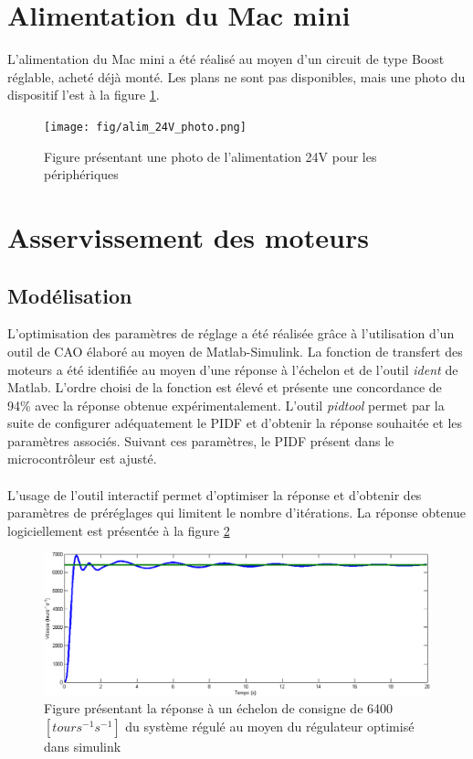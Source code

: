 \section{Alimentation du Mac mini}
L'alimentation du Mac mini a été réalisé au moyen d'un circuit de type Boost réglable, acheté déjà monté. Les plans ne sont pas disponibles, mais une photo du dispositif l'est à la figure \ref{fig:alim24Vphoto}.

\begin{figure}[htbp]
\centering
\texttt{[image: fig/alim\_24V\_photo.png]}
\caption{Figure présentant une photo de l'alimentation 24V pour les périphériques}
\label{fig:alim24Vphoto}
\end{figure}

\section{Asservissement des moteurs}
\subsection{Modélisation}
L'optimisation des paramètres de réglage a été réalisée grâce à l'utilisation d'un outil de CAO élaboré au moyen de Matlab-Simulink. La fonction de transfert des moteurs a été identifiée au moyen d'une réponse à l'échelon et de l'outil \textit{ident} de Matlab. L'ordre choisi de la fonction est élevé et présente une concordance de 94\% avec la réponse obtenue expérimentalement. L'outil \textit{pidtool} permet par la suite de configurer adéquatement le PIDF et d'obtenir la réponse souhaitée et les paramètres associés. Suivant ces paramètres, le PIDF présent dans le microcontrôleur est ajusté.
\paragraph{}L'usage de l'outil interactif permet d'optimiser la réponse et d'obtenir des paramètres de préréglages qui limitent le nombre d'itérations. La réponse obtenue logiciellement est présentée à la figure \ref{fig:as_1}
\begin{figure}[htbp]
\centering
\includegraphics[scale=0.6]{fig/asservissement_1.png}
\caption{Figure présentant la réponse à un échelon de consigne de 6400$\left[tours^{-1}s^{-1}\right]$ du système régulé au moyen du régulateur optimisé dans simulink}
\label{fig:as_1}
\end{figure}
